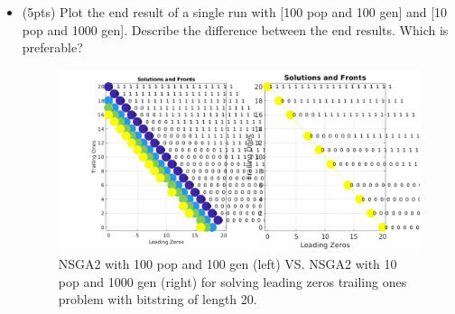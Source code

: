 \documentclass{article}
\begin{document}
\begin{itemize}
\begin{figure}[htpb]
        \caption{Comparison of quicksort (left) with NSGA2 (right) on 2 functions (leading zeros and trailing ones) for 100 pop and 100 gen on bitstring with size 20 on a single experiment.}\label{fig:quicksortVSnsga}
    \end{figure}
    \color{blue}
    \begin{itemize}
        \item As it can be seen from Figure~\ref{fig:quicksortVSnsga}, quicksort can't even find the front because the sorting is done only with one column. Second column will only be used if first column have a tie. This implicitly gives first function (leading zeros) more importance than second function (trailing ones). This is the reason why we see that most of the population at the end is gathered at the right bottom corner.
        \item One more thing to note from Figure~\ref{fig:quicksortVSnsga} (left) is that only one individual is in first front.
        \item Because of the above reasons, we can say that eventhough quicksort takes less time compared to NSGA2, it does not find the solution and thus time should not be the only criteria of performance measurement for these algorithms.
    \end{itemize}
    \color{black}
	\item (5pts) Plot the end result of a single run with [100 pop and 100 gen] and [10 pop and 1000 gen]. Describe the difference between the end results. Which is preferable?
        \begin{figure}[htpb]
            \centering
            \includegraphics[width=1.0\linewidth]{section3point2_comparision.jpg}
            \caption{NSGA2 with 100 pop and 100 gen (left) VS\@. NSGA2 with 10 pop and 1000 gen (right) for solving leading zeros trailing ones problem with bitstring of length 20.}\label{fig:comparision}
        \end{figure}


\end{itemize}
\end{document}
